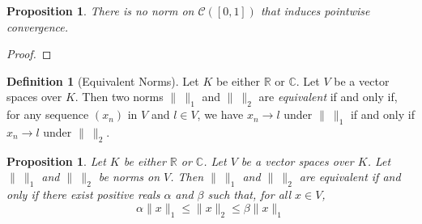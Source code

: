 \documentclass{book}
\let\qed\relax
\newtheorem{prop}[ax]{Proposition}
\theoremstyle{definition}
\newtheorem{df}[ax]{Definition}
\begin{document}
\begin{prop}
There is no norm on $\mathcal{C}([0,1])$ that induces pointwise convergence.
\end{prop}

\begin{proof}
\pf
{}
\qed
\end{proof}

\begin{df}[Equivalent Norms]
Let $K$ be either $\mathbb{R}$ or $\mathbb{C}$. Let $V$ be a vector spaces over $K$. Then two norms $\|\ \|_1$ and $\|\ \|_2$ are \emph{equivalent} if and only if, for any sequence $(x_n)$ in $V$ and $l \in V$, we have $x_n \rightarrow l$ under $\|\ \|_1$ if and only if $x_n \rightarrow l$ under $\|\ \|_2$.
\end{df}

\begin{prop}
Let $K$ be either $\mathbb{R}$ or $\mathbb{C}$. Let $V$ be a vector spaces over $K$. Let $\|\ \|_1$ and $\|\ \|_2$ be norms on $V$. Then $\|\ \|_1$ and $\|\ \|_2$ are equivalent if and only if there exist positive reals $\alpha$ and $\beta$ such that, for all $x \in V$,
\begin{equation}
\label{eq:eqnorm}
 \alpha \| x \|_1 \leq \| x \|_2 \leq \beta \| x \|_1
 \end{equation}
\end{prop}
\end{document}
